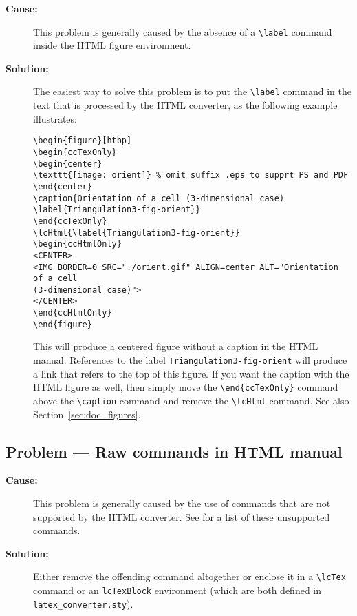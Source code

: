 \begin{description}
\item[{\bf Cause:}] This problem is generally caused by the absence of a
     \verb|\label| command inside the HTML figure environment.

\item[{\bf Solution:}]  
The easiest way to solve this problem is to put the 
\verb|\label| command in the text that is processed by the HTML converter,
as the following example illustrates:

\begin{verbatim}
\begin{figure}[htbp]
\begin{ccTexOnly}
\begin{center}
\texttt{[image: orient]} % omit suffix .eps to supprt PS and PDF
\end{center}
\caption{Orientation of a cell (3-dimensional case)
\label{Triangulation3-fig-orient}}
\end{ccTexOnly}
\lcHtml{\label{Triangulation3-fig-orient}}
\begin{ccHtmlOnly}
<CENTER>
<IMG BORDER=0 SRC="./orient.gif" ALIGN=center ALT="Orientation of a cell
(3-dimensional case)">
</CENTER>
\end{ccHtmlOnly}
\end{figure}
\end{verbatim}

This will produce a centered figure without a caption in the HTML manual.
References to the label {\tt Triangulation3-fig-orient} will produce a
link that refers to the top of this figure.  If you want the caption with
the HTML figure as well, then simply move the \verb|\end{ccTexOnly}|
command above the \verb|\caption| command and remove the \verb|\lcHtml|
command. See also Section~\ref{sec:doc_figures}.

\end{description}

\subsection*{Problem --- Raw  commands in HTML manual} 

\begin{description}
\item[{\bf Cause:}] This problem is generally caused by the use of commands
that are not supported by the HTML converter.  See 
 for a list of
these unsupported commands.  

\item[{\bf Solution:}] Either remove the offending command altogether or enclose
it in a \verb|\lcTex| command or an {\tt lcTexBlock} environment (which are
both defined in {\tt latex\_converter.sty}). 
\end{description}

